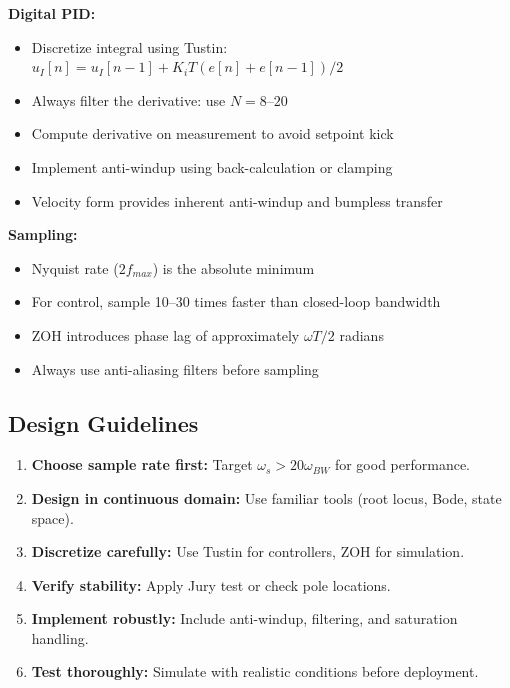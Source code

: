 \textbf{Digital PID:}
\begin{itemize}
    \item Discretize integral using Tustin: $u_I[n] = u_I[n-1] + K_i T(e[n] + e[n-1])/2$
    \item Always filter the derivative: use $N = 8$--$20$
    \item Compute derivative on measurement to avoid setpoint kick
    \item Implement anti-windup using back-calculation or clamping
    \item Velocity form provides inherent anti-windup and bumpless transfer
\end{itemize}

\textbf{Sampling:}
\begin{itemize}
    \item Nyquist rate ($2f_{max}$) is the absolute minimum
    \item For control, sample 10--30 times faster than closed-loop bandwidth
    \item ZOH introduces phase lag of approximately $\omega T/2$ radians
    \item Always use anti-aliasing filters before sampling
\end{itemize}

\subsection{Design Guidelines}

\begin{enumerate}
    \item \textbf{Choose sample rate first:} Target $\omega_s > 20 \omega_{BW}$ for good performance.

    \item \textbf{Design in continuous domain:} Use familiar tools (root locus, Bode, state space).

    \item \textbf{Discretize carefully:} Use Tustin for controllers, ZOH for simulation.

    \item \textbf{Verify stability:} Apply Jury test or check pole locations.

    \item \textbf{Implement robustly:} Include anti-windup, filtering, and saturation handling.

    \item \textbf{Test thoroughly:} Simulate with realistic conditions before deployment.
\end{enumerate}

